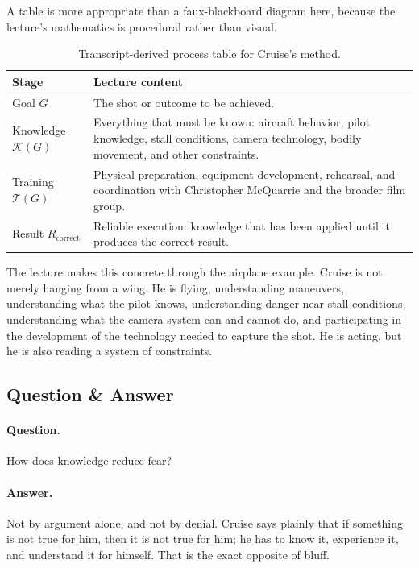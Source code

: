 A table is more appropriate than a faux-blackboard diagram here, because the lecture's mathematics is procedural rather than visual.

\begin{table}[h]
\centering
\begin{tabular}{|p{}|p{}|}
\hline
\textbf{Stage} & \textbf{Lecture content} \\
\hline
Goal \(G\) & The shot or outcome to be achieved. \\
\hline
Knowledge \(\mathcal{K}(G)\) & Everything that must be known: aircraft behavior, pilot knowledge, stall conditions, camera technology, bodily movement, and other constraints. \\
\hline
Training \(\mathcal{T}(G)\) & Physical preparation, equipment development, rehearsal, and coordination with Christopher McQuarrie and the broader film group. \\
\hline
Result \(R_{\mathrm{correct}}\) & Reliable execution: knowledge that has been applied until it produces the correct result. \\
\hline
\end{tabular}
\caption{Transcript-derived process table for Cruise's method.}
\end{table}

The lecture makes this concrete through the airplane example. Cruise is not merely hanging from a wing. He is flying, understanding maneuvers, understanding what the pilot knows, understanding danger near stall conditions, understanding what the camera system can and cannot do, and participating in the development of the technology needed to capture the shot. He is acting, but he is also reading a system of constraints.

\subsection{Question \& Answer}

\paragraph{Question.} How does knowledge reduce fear?

\paragraph{Answer.} Not by argument alone, and not by denial. Cruise says plainly that if something is not true for him, then it is not true for him; he has to know it, experience it, and understand it for himself. That is the exact opposite of bluff.

